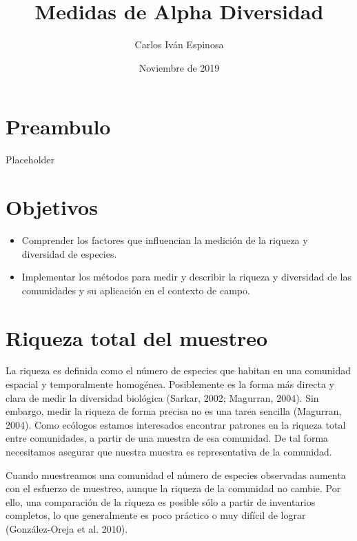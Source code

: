 \documentclass[]{book}
\title{Medidas de Alpha Diversidad}
\author{Carlos Iván Espinosa}
\date{Noviembre de 2019}
\providecommand{\tightlist}{%
  \setlength{\itemsep}{0pt}\setlength{\parskip}{0pt}}
\begin{document}
\maketitle

{
\setcounter{tocdepth}{1}
\tableofcontents
}
\chapter*{Preambulo}\label{preambulo}

Placeholder

\chapter*{Objetivos}\label{objetivos}

\begin{itemize}
\tightlist
\item
  Comprender los factores que influencian la medición de la riqueza y
  diversidad de especies.
\end{itemize}

\begin{itemize}
\tightlist
\item
  Implementar los métodos para medir y describir la riqueza y diversidad
  de las comunidades y su aplicación en el contexto de campo.
\end{itemize}

\chapter{Riqueza total del muestreo}\label{riqueza-total-del-muestreo}

La riqueza es definida como el número de especies que habitan en una
comunidad espacial y temporalmente homogénea. Posiblemente es la forma
más directa y clara de medir la diversidad biológica (Sarkar, 2002;
Magurran, 2004). Sin embargo, medir la riqueza de forma precisa no es
una tarea sencilla (Magurran, 2004). Como ecólogos estamos interesados
encontrar patrones en la riqueza total entre comunidades, a partir de
una muestra de esa comunidad. De tal forma necesitamos asegurar que
nuestra muestra es representativa de la comunidad.

Cuando muestreamos una comunidad el número de especies observadas
aumenta con el esfuerzo de muestreo, aunque la riqueza de la comunidad
no cambie. Por ello, una comparación de la riqueza es posible sólo a
partir de inventarios completos, lo que generalmente es poco práctico o
muy difícil de lograr (González-Oreja et al. 2010).
\end{document}
